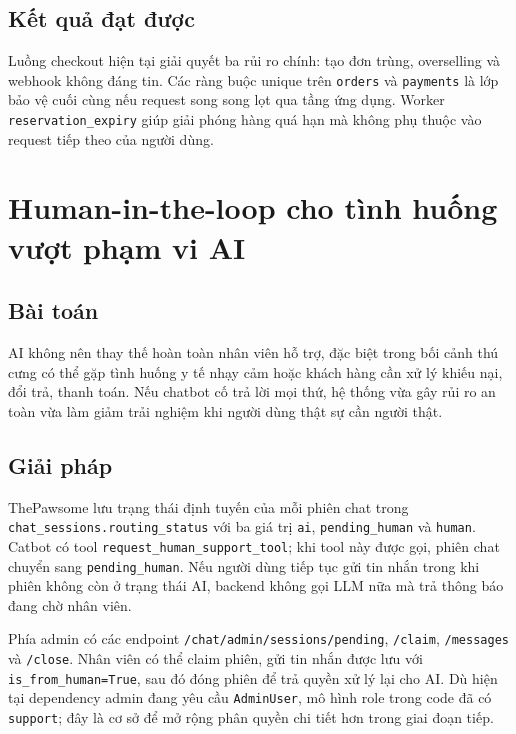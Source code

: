 \documentclass[../DoAn.tex]{subfiles}
\begin{document}
\subsection{Kết quả đạt được}
\label{subsection:5.3.3}

Luồng checkout hiện tại giải quyết ba rủi ro chính: tạo đơn trùng, overselling và webhook không đáng tin. Các ràng buộc unique trên \texttt{orders} và \texttt{payments} là lớp bảo vệ cuối cùng nếu request song song lọt qua tầng ứng dụng. Worker \texttt{reservation\_expiry} giúp giải phóng hàng quá hạn mà không phụ thuộc vào request tiếp theo của người dùng.

\section{Human-in-the-loop cho tình huống vượt phạm vi AI}
\label{section:5.4}

\subsection{Bài toán}
\label{subsection:5.4.1}

AI không nên thay thế hoàn toàn nhân viên hỗ trợ, đặc biệt trong bối cảnh thú cưng có thể gặp tình huống y tế nhạy cảm hoặc khách hàng cần xử lý khiếu nại, đổi trả, thanh toán. Nếu chatbot cố trả lời mọi thứ, hệ thống vừa gây rủi ro an toàn vừa làm giảm trải nghiệm khi người dùng thật sự cần người thật.

\subsection{Giải pháp}
\label{subsection:5.4.2}

ThePawsome lưu trạng thái định tuyến của mỗi phiên chat trong \texttt{chat\_sessions.routing\_status} với ba giá trị \texttt{ai}, \texttt{pending\_human} và \texttt{human}. Catbot có tool \texttt{request\_human\_support\_tool}; khi tool này được gọi, phiên chat chuyển sang \texttt{pending\_human}. Nếu người dùng tiếp tục gửi tin nhắn trong khi phiên không còn ở trạng thái AI, backend không gọi LLM nữa mà trả thông báo đang chờ nhân viên.

Phía admin có các endpoint \texttt{/chat/admin/sessions/pending}, \texttt{/claim}, \texttt{/messages} và \texttt{/close}. Nhân viên có thể claim phiên, gửi tin nhắn được lưu với \texttt{is\_from\_human=True}, sau đó đóng phiên để trả quyền xử lý lại cho AI. Dù hiện tại dependency admin đang yêu cầu \texttt{AdminUser}, mô hình role trong code đã có \texttt{support}; đây là cơ sở để mở rộng phân quyền chi tiết hơn trong giai đoạn tiếp.
\end{document}
